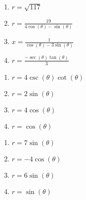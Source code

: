 \documentclass{ximera}
\begin{document}
\begin{multicols}{4}

\begin{enumerate}

\setcounter{enumi}{\value{HW}}

\item $r = \sqrt{117}$
\item $r = \frac{19}{4\cos(\theta) - \sin(\theta)}$
\item $x = \frac{1}{\cos(\theta) - 3\sin(\theta)}$
\item \small $r = \frac{-\sec(\theta)\tan(\theta)}{3}$ \normalsize

\setcounter{HW}{\value{enumi}}

\end{enumerate}

\end{multicols}

\begin{multicols}{4}

\begin{enumerate}

\setcounter{enumi}{\value{HW}}

\item \small $r = 4\csc(\theta)\cot(\theta)$ \normalsize
\item $r=2\sin(\theta)$
\item $r = 4\cos(\theta)$
\item $r = \cos(\theta)$

\setcounter{HW}{\value{enumi}}

\end{enumerate}

\end{multicols}

\begin{multicols}{4}

\begin{enumerate}

\setcounter{enumi}{\value{HW}}

\item $r = 7\sin(\theta)$
\item $r= -4\cos(\theta)$
\item $r = 6\sin(\theta)$
\item $r = \sin(\theta)$

\setcounter{HW}{\value{enumi}}

\end{enumerate}

\end{multicols}
\end{document}
